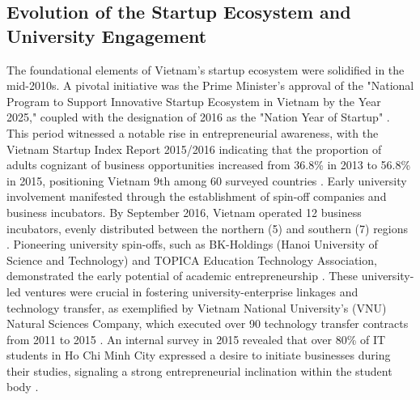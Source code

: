 \documentclass[../Main.tex]{subfiles}%
\begin{document}
	\subsection{Evolution of the Startup Ecosystem and University Engagement}
	The foundational elements of Vietnam's startup ecosystem were solidified in the mid-2010s. A pivotal initiative was the Prime Minister's approval of the "National Program to Support Innovative Startup Ecosystem in Vietnam by the Year 2025," coupled with the designation of 2016 as the "Nation Year of Startup" \cite{dinh2017promoting}. This period witnessed a notable rise in entrepreneurial awareness, with the Vietnam Startup Index Report 2015/2016 indicating that the proportion of adults cognizant of business opportunities increased from 36.8\% in 2013 to 56.8\% in 2015, positioning Vietnam 9th among 60 surveyed countries \cite{dinh2017promoting}. Early university involvement manifested through the establishment of spin-off companies and business incubators. By September 2016, Vietnam operated 12 business incubators, evenly distributed between the northern (5) and southern (7) regions \cite{dinh2017promoting}. Pioneering university spin-offs, such as BK-Holdings (Hanoi University of Science and Technology) and TOPICA Education Technology Association, demonstrated the early potential of academic entrepreneurship \cite{dinh2017promoting}. These university-led ventures were crucial in fostering university-enterprise linkages and technology transfer, as exemplified by Vietnam National University's (VNU) Natural Sciences Company, which executed over 90 technology transfer contracts from 2011 to 2015 \cite{dinh2017promoting}. An internal survey in 2015 revealed that over 80\% of IT students in Ho Chi Minh City expressed a desire to initiate businesses during their studies, signaling a strong entrepreneurial inclination within the student body \cite{dinh2017promoting}.
\end{document}
